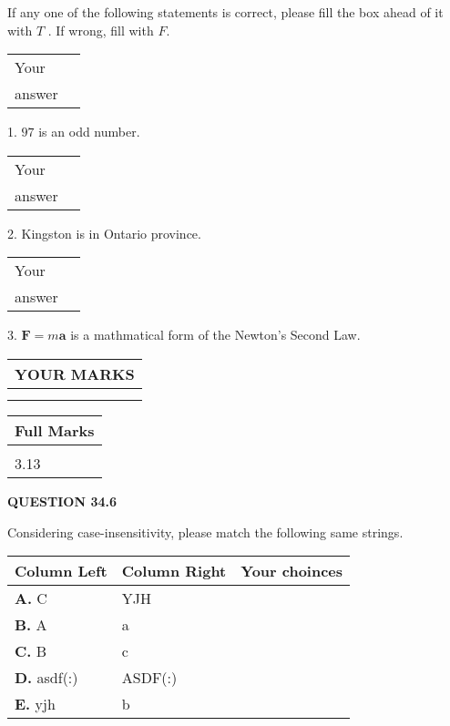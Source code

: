 \documentclass[12pt]{article}
\begin{document}
  
If any one of the following statements is correct, please fill the box ahead of it with $T$ .
If wrong, fill with $F$.
 
\noindent\begin{tabular}{|l|l|}\hline Your&\hspace{.2in} \\ answer&\hspace{.2in} \\ \hline \end{tabular}
1. $ %
97$ is an  %
odd number.
 
\noindent\begin{tabular}{|l|l|}\hline Your&\hspace{.2in} \\ answer&\hspace{.2in} \\ \hline \end{tabular}
2.  %
Kingston is in  %
Ontario province.
 
\noindent\begin{tabular}{|l|l|}\hline Your&\hspace{.2in} \\ answer&\hspace{.2in} \\ \hline \end{tabular}
3.  %
$\mathbf{F}=m\mathbf{a}$ is a mathmatical form of
the Newton's Second Law.
 

 
\vspace{0.3in}
  
\vspace{0.2in}
  
\noindent\begin{tabular}{|l|}
\hline
 YOUR MARKS  \\
\hline
 \\ 
 \\ 
\hline
\end{tabular}
\hspace{0.05in} \begin{tabular}{|l|}
\hline
 Full Marks  \\
\hline
 \\ 
3.13 \\
\hline
\end{tabular}
{\textbf{\Large{QUESTION
34.6 
}}}
  
  
Considering case-insensitivity, please match the following same strings.
  
  
\begin{tabular}{|l|l|l|}
 \hline
 Column Left & Column Right  & Your choinces \\ 
 \hline
{\textbf{\large{
A.}}}
C
  & 
YJH
 & 
 \\ 
 \hline
{\textbf{\large{
B.}}}
A
  & 
a
 & 
 \\ 
 \hline
{\textbf{\large{
C.}}}
B
  & 
c
 & 
 \\ 
 \hline
{\textbf{\large{
D.}}}
asdf(:)
  & 
ASDF(:)
 & 
 \\ 
 \hline
{\textbf{\large{
E.}}}
yjh
  & 
b
 & 
 \\ 
 \hline
 \end{tabular}
  
\end{document}
